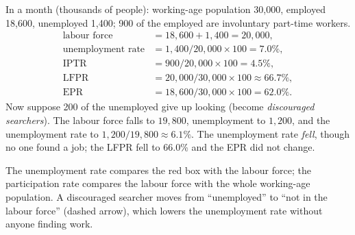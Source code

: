 \begin{example}
In a month (thousands of people): working-age population 30{,}000, employed 18{,}600,
unemployed 1{,}400; 900 of the employed are involuntary
part-time workers.
\begin{align*}
  \text{labour force} &= 18{,}600 + 1{,}400 = 20{,}000,\\
  \text{unemployment rate} &= 1{,}400/20{,}000 \times 100 = 7.0\%,\\
  \text{IPTR} &= 900/20{,}000 \times 100 = 4.5\%,\\
  \text{LFPR} &= 20{,}000/30{,}000 \times 100 \approx 66.7\%,\\
  \text{EPR} &= 18{,}600/30{,}000 \times 100 = 62.0\%.
\end{align*}
Now suppose 200 of the unemployed give up looking (become \emph{discouraged searchers}).
The labour force falls to $19{,}800$, unemployment to $1{,}200$, and the unemployment
rate to $1{,}200/19{,}800 \approx 6.1\%$. The unemployment rate \emph{fell}, though no one
found a job; the LFPR fell to 66.0\% and the EPR did not change.
\end{example}

\begin{center}
\end{center}
The unemployment rate compares the red box with the labour force; the participation rate
compares the labour force with the whole working-age population. A discouraged searcher
moves from ``unemployed'' to ``not in the labour force'' (dashed arrow), which lowers the
unemployment rate without anyone finding work.

